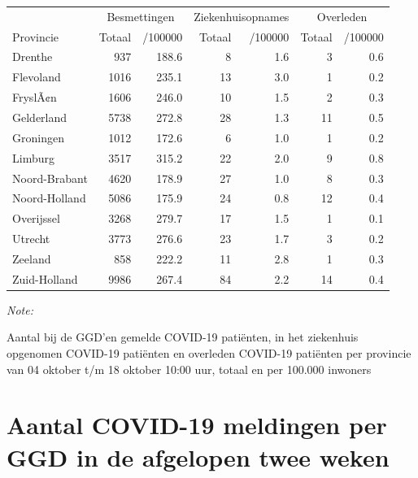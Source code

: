 \documentclass[
  english,
  man,floatsintext]{apa6}
\begin{document}
\begin{table}
\centering
\begin{threeparttable}
\begin{tabular}{lrrrrrr}
\toprule
\multicolumn{1}{c}{ } & \multicolumn{2}{c}{Besmettingen} & \multicolumn{2}{c}{Ziekenhuisopnames} & \multicolumn{2}{c}{Overleden} \\
\cmidrule(l{3pt}r{3pt}){2-3} \cmidrule(l{3pt}r{3pt}){4-5} \cmidrule(l{3pt}r{3pt}){6-7}
Provincie & Totaal & /100000 & Totaal & /100000 & Totaal & /100000\\
\midrule
Drenthe & 937 & 188.6 & 8 & 1.6 & 3 & 0.6\\
Flevoland & 1016 & 235.1 & 13 & 3.0 & 1 & 0.2\\
FryslÃ¢n & 1606 & 246.0 & 10 & 1.5 & 2 & 0.3\\
Gelderland & 5738 & 272.8 & 28 & 1.3 & 11 & 0.5\\
Groningen & 1012 & 172.6 & 6 & 1.0 & 1 & 0.2\\
Limburg & 3517 & 315.2 & 22 & 2.0 & 9 & 0.8\\
Noord-Brabant & 4620 & 178.9 & 27 & 1.0 & 8 & 0.3\\
Noord-Holland & 5086 & 175.9 & 24 & 0.8 & 12 & 0.4\\
Overijssel & 3268 & 279.7 & 17 & 1.5 & 1 & 0.1\\
Utrecht & 3773 & 276.6 & 23 & 1.7 & 3 & 0.2\\
Zeeland & 858 & 222.2 & 11 & 2.8 & 1 & 0.3\\
Zuid-Holland & 9986 & 267.4 & 84 & 2.2 & 14 & 0.4\\
\bottomrule
\end{tabular}
\begin{tablenotes}
\item \textit{Note: } 
\item Aantal bij de GGD’en gemelde COVID-19 patiënten, in het ziekenhuis opgenomen COVID-19 patiënten en overleden COVID-19 patiënten per provincie van 04 oktober t/m 18 oktober 10:00 uur, totaal en per 100.000 inwoners
\end{tablenotes}
\end{threeparttable}
\end{table}

\newpage

\hypertarget{aantal-covid-19-meldingen-per-ggd-in-de-afgelopen-twee-weken}{%
\section{Aantal COVID-19 meldingen per GGD in de afgelopen twee weken}\label{aantal-covid-19-meldingen-per-ggd-in-de-afgelopen-twee-weken}}
\end{document}
